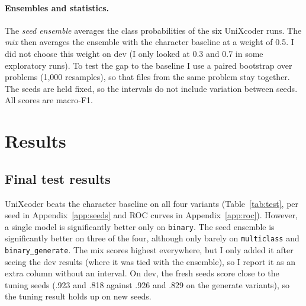\documentclass[11pt]{article}
\begin{document}
\paragraph{Ensembles and statistics.}
The \emph{seed ensemble} averages the class probabilities of the six UniXcoder runs. The \emph{mix} then averages the ensemble with the character baseline at a weight of 0.5. I did not choose this weight on dev (I only looked at 0.3 and 0.7 in some exploratory runs). To test the gap to the baseline I use a paired bootstrap over problems (1,000 resamples), so that files from the same problem stay together. The seeds are held fixed, so the intervals do not include variation between seeds. All scores are macro-F1.

\section{Results}
\label{sec:results}

\subsection{Final test results}
\label{sec:final-test}

UniXcoder beats the character baseline on all four variants (Table~\ref{tab:test}, per seed in Appendix~\ref{app:seeds} and ROC curves in Appendix~\ref{app:roc}). However, a single model is significantly better only on \texttt{binary}. The seed ensemble is significantly better on three of the four, although only barely on \texttt{multiclass} and \texttt{binary\_generate}. The mix scores highest everywhere, but I only added it after seeing the dev results (where it was tied with the ensemble), so I report it as an extra column without an interval. On dev, the fresh seeds score close to the tuning seeds (.923 and .818 against .926 and .829 on the generate variants), so the tuning result holds up on new seeds.
\end{document}
